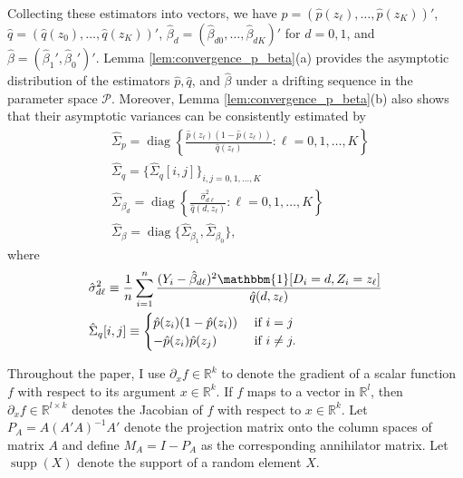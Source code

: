 \documentclass[11pt]{article}
\theoremstyle{definition}
\DeclareMathOperator*{\supp}{supp}
\DeclareMathOperator*{\diag}{diag}
\newcommand{\R}{\ensuremath{\mathbb{R}}}
\newcommand{\0}{\ensuremath{\mathbf{0}}}
\newcommand{\indicator}{\ensuremath{\mathbbm{1}}}
\begin{document}
\begin{bibunit}
Collecting these estimators into vectors, we have $\hat{p} = (\hat{p}(z_\ell), \ldots, \hat{p}(z_K))'$, $\hat{q} = (\hat{q}(z_0),\ldots,\hat{q}(z_K))'$, $\hat{\beta}_d = (\hat{\beta}_{d0}, \ldots, \hat{\beta}_{dK})'$ for $d = 0,1$, and $\hat{\beta} = (\hat{\beta}_1', \hat{\beta}_0')'$. Lemma \ref{lem:convergence_p_beta}(a) provides the asymptotic distribution of the estimators $\hat{p}, \hat{q}$, and $\hat{\beta}$ under a drifting sequence in the parameter space $\mathcal{P}$. Moreover, Lemma \ref{lem:convergence_p_beta}(b) also shows that their asymptotic variances can be consistently estimated by 
\begin{align*}
	&\hat{\Sigma}_p = \diag\left\{\frac{\hat{p}(z_\ell)(1-\hat{p}(z_\ell))}{\hat{q}(z_\ell)}: \ell = 0,1,\ldots,K\right\} \\
	&\hat{\Sigma}_q = \{\hat{\Sigma}_q[i,j]\}_{i,j = 0,1,\ldots,K} \\
	&\hat{\Sigma}_{\beta_d} = \diag\left\{\frac{\hat{\sigma}_{d\ell}^2}{\hat{q}(d,z_\ell)}: \ell = 0,1,\ldots,K\right\} \\
        &\hat{\Sigma}_\beta = \diag\{\hat{\Sigma}_{\beta_1}, \hat{\Sigma}_{\beta_0}\},
\end{align*}
where 
\begin{align*}
    & \hat{\sigma}_{d\ell}^2 \equiv \frac{1}{n} \sum_{i=1}^n \frac{(Y_i - \hat{\beta}_{d\ell})^2\indicator[D_i=d, Z_i=z_\ell]}{\hat{q}(d,z_\ell)} \\
    & \hat{\Sigma}_q[i,j] 
        \equiv
        \begin{cases}
        \hat{p}(z_i) (1-\hat{p}(z_i))   & \text{ if } i = j\\
        -\hat{p}(z_i) \hat{p}(z_j)      & \text{ if } i \neq j.
        \end{cases}
\end{align*}

Throughout the paper, I use $\partial_x f \in \R^{k}$ to denote the gradient of a scalar function $f$ with respect to its argument $x\in \R^k$. If $f$ maps to a vector in $\R^l$, then $\partial_x f \in \R^{l\times k}$ denotes the Jacobian of $f$ with respect to $x\in\R^k$. Let $P_A = A(A'A)^{-1}A'$ denote the projection matrix onto the column spaces of matrix $A$ and define $M_A = I - P_A$ as the corresponding annihilator matrix. Let $\supp(X)$ denote the support of a random element $X$.
 



\end{bibunit}
\end{document}
